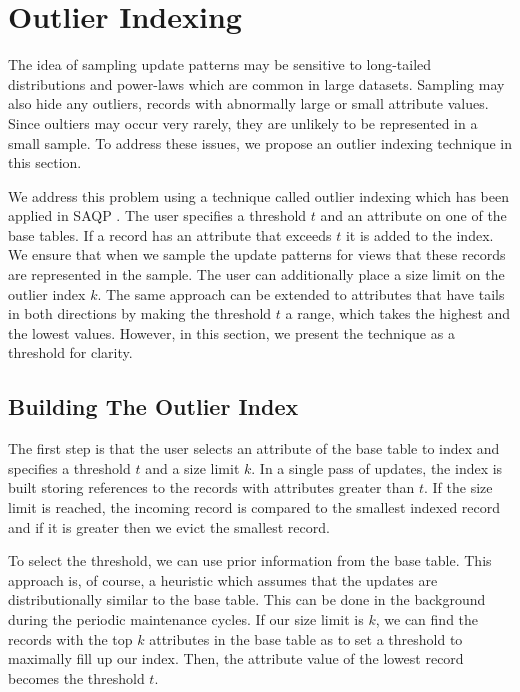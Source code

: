 \section{Outlier Indexing}\label{outlier}
The idea of sampling update patterns may be sensitive to long-tailed distributions and power-laws which are common in large datasets\cite{clauset2009power}. 
Sampling may also hide any outliers, records with abnormally large or small attribute values.
Since oultiers may occur very rarely, they are unlikely to be represented in a small sample. To address these issues, we propose an outlier indexing technique in this section. 

We address this problem using a technique called outlier indexing which has been applied in SAQP \cite{chaudhuri2001overcoming}.
The user specifies a threshold $t$ and an attribute on one of the base tables.
If a record has an attribute that exceeds $t$ it is added to the index.
We ensure that when we sample the update patterns for views that these records are represented in the sample.
The user can additionally place a size limit on the outlier index $k$.
The same approach can be extended to attributes that have tails in both directions by making the threshold $t$ a range, which takes the highest and the lowest values.
However, in this section, we present the technique as a threshold for clarity.

\subsection{Building The Outlier Index}
The first step is that the user selects an attribute of the base table to index and specifies a threshold $t$ and a size limit $k$.
In a single pass of updates, the index is built storing references to the records with attributes greater than $t$.
If the size limit is reached, the incoming record is compared to the smallest indexed record and if it is greater then we evict the smallest record.


To select the threshold, we can use prior information from the base table.
This approach is, of course, a heuristic which assumes that the updates are distributionally similar to the 
base table. 
This can be done in the background during the periodic maintenance cycles.
If our size limit is $k$, we can find the records with the top $k$ attributes in the base table as to set a threshold to maximally fill up our index. 
Then, the attribute value of the lowest record becomes the threshold $t$.

